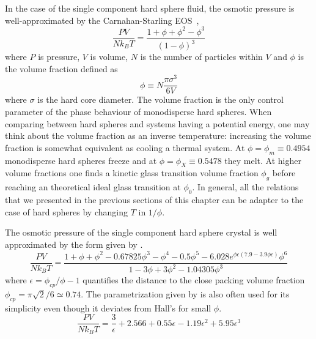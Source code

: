 In the case of the single component hard sphere fluid, the osmotic pressure is well-approximated by the Carnahan-Starling \ac{EOS}~\citep{carnahan1969},
\begin{equation}
\frac{PV}{N k_B T}=\frac{1 + \phi + \phi^2 - \phi^3}{(1 - \phi)^3}
\label{eq:CS}
\end{equation}
where $P$ is pressure, $V$ is volume, $N$ is the number of particles within $V$ and $\phi$ is the volume fraction defined as 
\begin{equation}
	\phi \equiv N \frac{\pi\sigma^3}{6 V}
	\label{eq:vf_mono}
\end{equation}
where $\sigma$ is the hard core diameter. The volume fraction is the only control parameter of the phase behaviour of monodisperse hard spheres. When comparing between hard spheres and systems having a potential energy, one may think about the volume fraction as an inverse temperature: increasing the volume fraction is somewhat equivalent as cooling a thermal system. At $\phi=\phi_m \equiv 0.4954$ monodisperse hard spheres freeze and at $\phi=\phi_X \equiv 0.5478$ they melt. At higher volume fractions one finds a kinetic glass transition volume fraction $\phi_g$ before reaching an theoretical ideal glass transition at $\phi_0$. In general, all the relations that we presented in the previous sections of this chapter can be adapter to the case of hard spheres by changing $T$ in $1/\phi$.

The osmotic pressure of the single component hard sphere crystal is well approximated by the form given by \citet{hall1972}.
\begin{equation}
\frac{PV}{N k_B T} = \frac{
1 + \phi + \phi^2 - 0.67825 \phi^3 - \phi^4 - 0.5 \phi^5 - 6.028 e^{\phi\epsilon(7.9-3.9\phi\epsilon)}\phi^6
}{
1 - 3 \phi + 3 \phi^2 - 1.04305 \phi^3
}
\label{eq:Hall}
\end{equation}
where $\epsilon=\phi_{cp}/\phi -1$ quantifies the distance to the close packing volume fraction $\phi_{cp} = \pi\sqrt{2}/6 \simeq 0.74$. The parametrization given by \citet{Young1979} is also often used for its simplicity even though it deviates from Hall's for small $\phi$.
\begin{equation}
\frac{PV}{Nk_{B}T} = \frac{3}{\epsilon} + 2.566 + 0.55 \epsilon - 1.19 \epsilon^2 + 5.95 \epsilon^3
\label{eq:Alder}
\end{equation}

